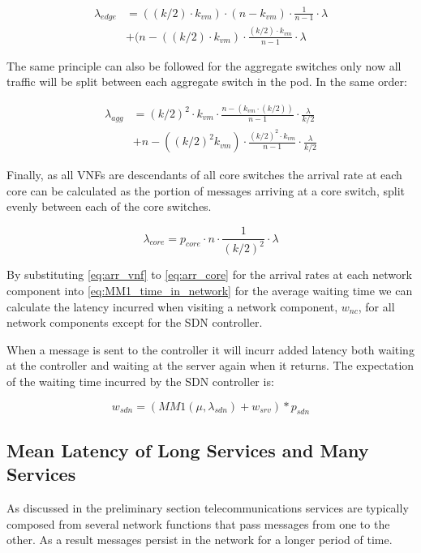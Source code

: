 \begin{equation}
\label{eq:arr_edge}
\begin{split}
\lambda_{edge} &= ((k/2) \cdot k_{vm}) \cdot (n - k_{vm}) \cdot \frac{1}{n - 1} \cdot \lambda \\
			   &+ (n - ((k/2) \cdot k_{vm}) \cdot \frac{(k/2) \cdot k_{vm}}{n - 1} \cdot \lambda 
\end{split}
\end{equation}

The same principle can also be followed for the aggregate switches only now all traffic will be split between each aggregate switch in the pod. In the same order:

\begin{equation}
\label{eq:arr_agg}
\begin{split}
\lambda_{agg} &= (k/2)^2 \cdot k_{vm} \cdot \frac{n - (k_{vm} \cdot (k/2))}{n - 1} \cdot \frac{\lambda}{k/2} \\
			  &+ n - ((k/2)^2 k_{vm}) \cdot \frac{(k/2)^2 \cdot k_{vm}}{n - 1} \cdot \frac{\lambda}{k/2}
\end{split}
\end{equation}

Finally, as all VNFs are descendants of all core switches the arrival rate at each core can be calculated as the portion of messages arriving at a core switch, split evenly between each of the core switches.

\begin{equation}
\label{eq:arr_core}
\lambda_{core} = p_{core} \cdot n \cdot  \frac{1}{(k / 2)^2} \cdot  \lambda
\end{equation}

By substituting \ref{eq:arr_vnf} to \ref{eq:arr_core} for the arrival rates at each network component into \ref{eq:MM1_time_in_network} for the average waiting time we can calculate the latency incurred when visiting a network component, $w_{nc}$, for all network components except for the SDN controller.

When a message is sent to the controller it will incurr added latency both waiting at the controller and waiting at the server again when it returns. The expectation of the waiting time incurred by the SDN controller is:

\begin{equation}
w_{sdn} = (MM1(\mu, \lambda_{sdn}) + w_{srv}) * p_{sdn}
\end{equation}

\subsection{Mean Latency of Long Services and Many Services}
As discussed in the preliminary section telecommunications services are typically composed from several network functions that pass messages from one to the other. As a result messages persist in the network for a longer period of time. 

